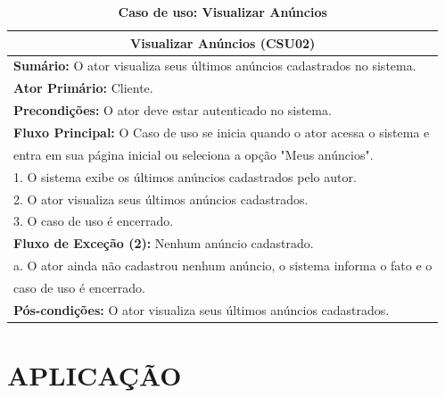 \documentclass[
	12pt,				%
	openright,			%
	oneside,			%
	a4paper,			%
	chapter=TITLE,		%
	section=TITLE,		%
	english,			%
	french,				%
	spanish,			%
	brazil				%
	]{abntex2}
\begin{document}
\begin{table}[Htp!]
	\begin{center}
		\def\arraystretch{1.5}
		\caption{\textbf{Caso de uso: Visualizar Anúncios}}
		\label{tab-csu-visualizarAnuncios}
		\begin{tabular}{|l|}
			\hline
			\multicolumn{1}{|c|}{	\textbf{Visualizar Anúncios (CSU02)}} \\ \hline
			
			
			\textbf{Sumário:} O ator visualiza seus últimos anúncios cadastrados no sistema. \\
			\textbf{Ator Primário:} Cliente. \\
			\textbf{Precondições:} O ator deve estar autenticado no sistema. \\ \hline
			
			
			\textbf{Fluxo Principal:} O Caso de uso se inicia quando o ator acessa o sistema e \\ entra em sua página inicial ou seleciona a opção "Meus anúncios". \\
			
			
			1.	O sistema exibe os últimos anúncios cadastrados pelo autor. \\
			2.	O ator visualiza seus últimos anúncios cadastrados. \\
			3.	O caso de uso é encerrado. \\ \hline


			\textbf{Fluxo de Exceção (2):} Nenhum anúncio cadastrado. \\
			a. O ator ainda não cadastrou nenhum anúncio, o sistema informa o fato e o \\ caso de uso é encerrado. \\ \hline
			
			\textbf{Pós-condições:} O ator visualiza seus últimos anúncios cadastrados. \\ \hline

		\end{tabular}
	\end{center}
\end{table}



\section{APLICAÇÃO}
\end{document}
